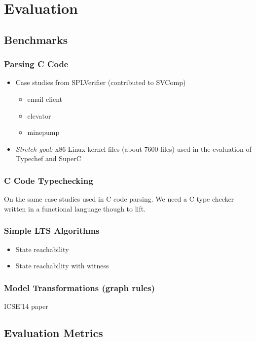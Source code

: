 \documentclass[12pt]{article}
\begin{document}
\section{Evaluation}
\subsection{Benchmarks}
\subsubsection{Parsing C Code}

\begin{itemize}
	\item Case studies from SPLVerifier (contributed to SVComp)
	\begin{itemize}
		\item email client
		\item elevator
		\item minepump
	\end{itemize}
	
	\item \emph{Stretch goal:} x86 Linux kernel files (about 7600 files) used in the evaluation of Typechef and SuperC
\end{itemize}

\subsubsection{C Code Typechecking}
On the same case studies used in C code parsing.
We need a C type checker written in a functional language though to lift.

\subsubsection{Simple LTS Algorithms}
\begin{itemize}
	\item State reachability
	\item State reachability with witness
\end{itemize}

\subsubsection{Model Transformations (graph rules)}
ICSE'14 paper

\subsection{Evaluation Metrics}
\end{document}
